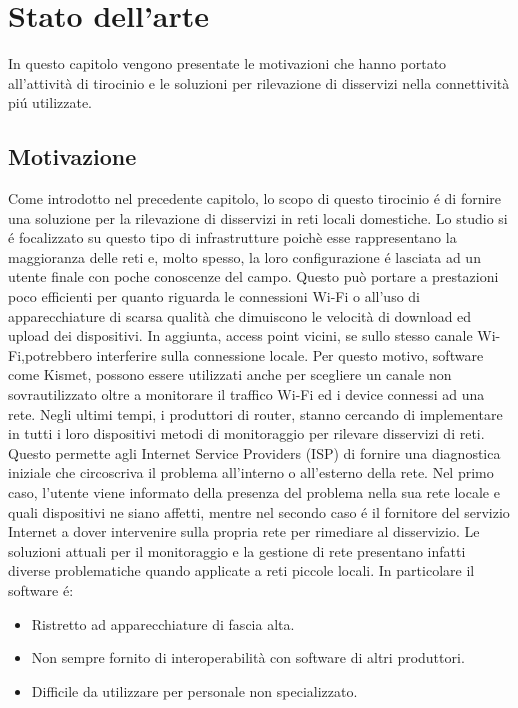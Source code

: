 \chapter{Stato dell'arte}
In questo capitolo vengono presentate le motivazioni che hanno portato all'attivit\`a di tirocinio e le soluzioni per rilevazione di disservizi nella connettivit\`a pi\'u utilizzate.

\section{Motivazione}
Come introdotto nel precedente capitolo, lo scopo di questo tirocinio \'e di fornire una soluzione per la rilevazione di disservizi in reti locali domestiche.
Lo studio si \'e focalizzato su questo tipo di infrastrutture poich\`e esse rappresentano la maggioranza delle reti e, molto spesso, la loro configurazione \'e  lasciata ad un utente finale con poche conoscenze del campo.
Questo pu\`o portare a prestazioni poco efficienti per quanto riguarda le connessioni Wi-Fi o all'uso di apparecchiature di scarsa qualit\`a che dimuiscono le velocit\`a di download ed upload dei dispositivi.
In aggiunta, access point vicini, se sullo stesso canale Wi-Fi,potrebbero interferire sulla connessione locale.
Per questo motivo, software come Kismet\cite{kismet}, possono essere utilizzati anche per scegliere un canale non sovrautilizzato oltre a monitorare il traffico Wi-Fi ed i device connessi ad una rete.
Negli ultimi tempi, i produttori di router, stanno cercando di implementare in tutti i loro dispositivi metodi di monitoraggio per rilevare disservizi di reti.
Questo permette agli Internet Service Providers (ISP) di fornire una diagnostica iniziale che circoscriva il problema all'interno o all'esterno della rete.
Nel primo caso, l'utente viene informato della presenza del problema nella sua rete locale e quali dispositivi ne siano affetti, mentre nel secondo caso \'e il fornitore del servizio Internet a dover intervenire sulla propria rete per rimediare al disservizio.
Le soluzioni attuali per il monitoraggio e la gestione di rete presentano infatti diverse problematiche quando applicate a reti piccole locali.
\newpage
In particolare il software \'e:
\begin{itemize}
	\item Ristretto ad apparecchiature di fascia alta.
	\item Non sempre fornito di interoperabilit\`a con software di altri produttori.
	\item Difficile da utilizzare per personale non specializzato.
\end{itemize}

